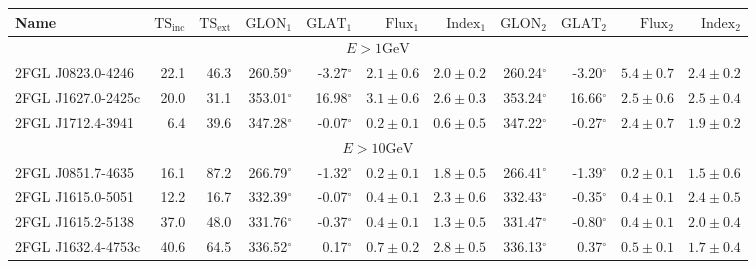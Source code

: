 \documentclass[12pt,preprint]{aastex}
\newcommand{\gev}{\text{GeV}\xspace}
\newcommand{\tsext}{{\ensuremath{\text{TS}_\text{ext}}}\xspace}
\newcommand{\tsinc}{\ensuremath{\text{TS}_\text{inc}}\xspace}
\newcommand{\glon}{\text{GLON}\xspace}
\newcommand{\glat}{\text{GLAT}\xspace}
\renewcommand{\deg}{\ensuremath{^\circ}\xspace}
\begin{document}
\clearpage
\begin{table}
    \begin{centering}
      \begin{tabular}{l|rr|rrrr|rrrr}
        \hline
        \hline
        Name                 &     \tsinc &     \tsext &      $\glon_1$ &      $\glat_1$ &   $\text{Flux}_1$ &   $\text{Index}_1$ &      $\glon_2$ &      $\glat_2$ &   $\text{Flux}_2$ &  $\text{Index}_2$ \\
        \hline
        \multicolumn{11}{c}{$E > 1 \gev$} \\
        \hline
        2FGL J0823.0-4246    &       22.1 &       46.3 &     260.59\deg &      -3.27\deg & $       2.1 \pm        0.6$ & $  2.0 \pm   0.2$  &     260.24\deg &      -3.20\deg & $       5.4 \pm        0.7$ & $  2.4 \pm   0.2$ \\
        2FGL J1627.0-2425c   &       20.0 &       31.1 &     353.01\deg &      16.98\deg & $       3.1 \pm        0.6$ & $  2.6 \pm   0.3$  &     353.24\deg &      16.66\deg & $       2.5 \pm        0.6$ & $  2.5 \pm   0.4$ \\
        2FGL J1712.4-3941    &        6.4 &       39.6 &     347.28\deg &      -0.07\deg & $       0.2 \pm        0.1$ & $  0.6 \pm   0.5$  &     347.22\deg &      -0.27\deg & $       2.4 \pm        0.7$ & $  1.9 \pm   0.2$ \\
        \hline
        \multicolumn{11}{c}{$E > 10 \gev$} \\
        \hline
        2FGL J0851.7-4635    &       16.1 &       87.2 &     266.79\deg &      -1.32\deg & $       0.2 \pm        0.1$ & $  1.8 \pm   0.5$  &     266.41\deg &      -1.39\deg & $       0.2 \pm        0.1$ & $  1.5 \pm   0.6$ \\
        2FGL J1615.0-5051    &       12.2 &       16.7 &     332.39\deg &      -0.07\deg & $       0.4 \pm        0.1$ & $  2.3 \pm   0.6$  &     332.43\deg &      -0.35\deg & $       0.4 \pm        0.1$ & $  2.4 \pm   0.5$ \\
        2FGL J1615.2-5138    &       37.0 &       48.0 &     331.76\deg &      -0.37\deg & $       0.4 \pm        0.1$ & $  1.3 \pm   0.5$  &     331.47\deg &      -0.80\deg & $       0.4 \pm        0.1$ & $  2.0 \pm   0.4$ \\
        2FGL J1632.4-4753c   &       40.6 &       64.5 &     336.52\deg &       0.17\deg & $       0.7 \pm        0.2$ & $  2.8 \pm   0.5$  &     336.13\deg &       0.37\deg & $       0.5 \pm        0.1$ & $  1.7 \pm   0.4$ \\

\end{tabular}
\end{centering}
\end{table}
\end{document}
